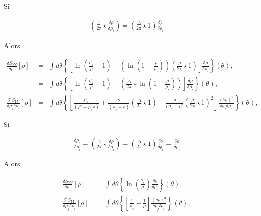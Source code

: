 \begin{aff}
	Si
	
		\begin{eqnarray}
			\left  ( \frac{\Delta}{2\pi} \star \frac{\delta \rho}{\delta \rho_i}  \right ) =  \left  ( \frac{\Delta}{2\pi} \star  1 \right )	\frac{\delta \rho}{\delta \rho_i} 
		\end{eqnarray}
		
		Alors 
		
		\begin{eqnarray}
			\frac{ \delta S_{YY} }{ \delta \rho_i } [\rho ]  & = & \int  d\theta \left \{  \left [ \ln \left ( \frac{ \rho_s}{ \rho} - 1 \right ) -  \left ( \ln \left ( 1 - \frac{ \rho}{ \rho_s}\right ) \right ) \left ( \frac{ \Delta}{2 \pi} \star   1  \right) \right ]  \frac{\delta \rho }{ \delta \rho_i }\right \} ( \theta ) ,\\
			& = & \int  d\theta \left \{  \left [ \ln \left ( \frac{ \rho_s}{ \rho} - 1 \right ) -  \left ( \frac{ \Delta}{2 \pi} \star   \ln \left ( 1 - \frac{ \rho}{ \rho_s}\right )  \right) \right ]  \frac{\delta \rho }{ \delta \rho_i }\right \} ( \theta ), \\
			\frac{ \delta^2 S_{YY} }{ \delta \rho_j\delta \rho_i } [\rho ]  & = &  \int  d\theta\left \{  \left [  \frac{\rho_s}{(\rho^2  - \rho_s\rho)}  +  \frac{2}{( \rho_s - \rho ) } \left (  \frac{\Delta}{2\pi} \star 1    \right )  +  \frac{\rho }{\rho\rho_s - \rho_s^2 }\left (  \frac{\Delta}{2\pi} \star 1 \right )^2  \right ]   \frac{(\delta \rho)^2}{\delta \rho_j \delta \rho_i} \right \}(\theta),
	\end{eqnarray}
	
	Si 
		
		\begin{eqnarray}
			\frac{\delta \rho_s}{\delta \rho_i}  = \left  ( \frac{\Delta}{2\pi} \star \frac{\delta \rho}{\delta \rho_i}  \right ) =  \left  ( \frac{\Delta}{2\pi} \star  1 \right )	\frac{\delta \rho}{\delta \rho_i}  = \frac{\delta \rho}{\delta \rho_i} 	
		\end{eqnarray}
		
		
		Alors 
		
		\begin{eqnarray}
			\frac{ \delta S_{YY} }{ \delta \rho_i } [\rho ]  & = & \int d \theta \left \{ \ln \left ( \frac{ \rho_s}{ \rho}\right )\frac{\delta \rho }{ \delta \rho_i } \right \}( \theta ),\\
			\frac{ \delta^2 S_{YY} }{ \delta \rho_j\delta \rho_i } [\rho ] & = & 	\int  d\theta\left \{  \left [ \frac{1}{\rho_s} - \frac{1}{\rho} \right ]   \frac{(\delta \rho)^2}{\delta \rho_j \delta \rho_i} \right \}(\theta),	
		\end{eqnarray}	
	\end{aff}



